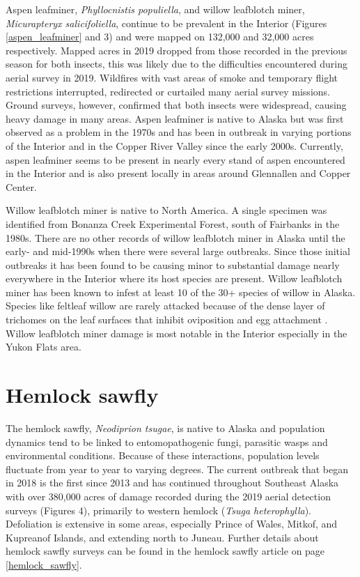 Aspen leafminer, \textit{Phyllocnistis populiella}, and willow leafblotch miner, \textit{Micurapteryx salicifoliella}, continue to be prevalent in the Interior (Figures \ref{aspen_leafminer} and 3) and were mapped on 132,000 and 32,000 acres respectively. Mapped acres in 2019 dropped from those recorded in the previous season for both insects, this was likely due to the difficulties encountered during aerial survey in 2019. Wildfires with vast areas of smoke and temporary flight restrictions interrupted, redirected or curtailed many aerial survey missions. Ground surveys, however, confirmed that both insects were widespread, causing heavy damage in many areas. Aspen leafminer is native to Alaska but was first observed as a problem in the 1970s and has been in outbreak in varying portions of the Interior and in the Copper River Valley since the early 2000s. Currently, aspen leafminer seems to be present in nearly every stand of aspen encountered in the Interior and is also present locally in areas around Glennallen and Copper Center. 



Willow leafblotch miner is native to North America. A single specimen was identified from Bonanza Creek Experimental Forest, south of Fairbanks in the 1980s. There are no other records of willow leafblotch miner in Alaska until the early- and mid-1990s when there were several large outbreaks. Since those initial outbreaks it has been found to be causing minor to substantial damage nearly everywhere in the Interior where its host species are present. Willow leafblotch miner has been known to infest at least 10 of the 30+ species of willow in Alaska. Species like feltleaf willow are rarely attacked because of the dense layer of trichomes on the leaf surfaces that inhibit oviposition and egg attachment \citep{Furnissetal2001}. Willow leafblotch miner damage is most notable in the Interior especially in the Yukon Flats area. 

\section{Hemlock sawfly}

The hemlock sawfly, \textit{Neodiprion tsugae}, is native to Alaska and population dynamics tend to be linked to entomopathogenic fungi, parasitic wasps and environmental conditions. Because of these interactions, population levels fluctuate from year to year to varying degrees. The current outbreak that began in 2018 is the first since 2013 and has continued throughout Southeast Alaska with over 380,000 acres of damage recorded during the 2019 aerial detection surveys (Figures 4), primarily to western hemlock (\textit{Tsuga heterophylla}). Defoliation is extensive in some areas, especially Prince of Wales, Mitkof, and Kupreanof Islands, and extending north to Juneau. Further details about hemlock sawfly surveys can be found in the hemlock sawfly article on page \ref{hemlock_sawfly}.  

